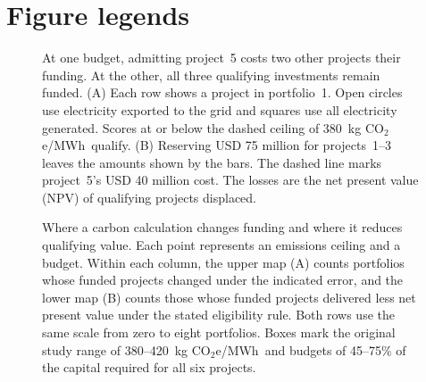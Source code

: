 \documentclass[HARVARD,twocolumn]{USG}
\newcommand{\unit}{kg CO$_2$e/MWh}
\begin{document}
  \section*{Figure legends}
\begin{figure}[!ht]
\centering

\caption{At one budget, admitting project~5 costs two other projects their funding. At the other, all three qualifying investments remain funded. (A) Each row shows a project in portfolio~1. Open circles use electricity exported to the grid and squares use all electricity generated. Scores at or below the dashed ceiling of 380~\unit\ qualify. (B) Reserving USD 75 million for projects~1--3 leaves the amounts shown by the bars. The dashed line marks project~5's USD 40 million cost. The losses are the net present value (NPV) of qualifying projects displaced.}\label{fig:project}

\end{figure}
\begin{figure}[!ht]
\centering

\caption{Where a carbon calculation changes funding and where it reduces qualifying value. Each point represents an emissions ceiling and a budget. Within each column, the upper map (A) counts portfolios whose funded projects changed under the indicated error, and the lower map (B) counts those whose funded projects delivered less net present value under the stated eligibility rule. Both rows use the same scale from zero to eight portfolios. Boxes mark the original study range of 380--420~\unit\ and budgets of 45--75\% of the capital required for all six projects.}\label{fig:map}

\end{figure}
\clearpage
\fi
\end{document}
